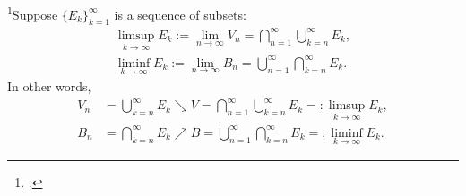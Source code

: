 \documentclass[UTF8,a4paper,10pt]{article}
\begin{document}
  \begin{mybox}{}

    
    \footcite[][49]{Wheeden_Zygmund_2015}Suppose \(\{E_k\}_{k=1}^{\infty}\) is a sequence of subsets:
    \begin{equation*}
      \begin{aligned}
        \limsup_{k\to\infty}E_k := \lim_{n\to\infty} V_n = \bigcap_{n=1}^{\infty}  \bigcup_{k=n}^{\infty} E_k,\\
        \liminf_{k\to\infty}E_k := \lim_{n\to\infty} B_n = \bigcup_{n=1}^{\infty}  \bigcap_{k=n}^{\infty} E_k.
      \end{aligned}
    \end{equation*}
    In other words,
    \begin{equation*}
      \begin{aligned}
         V_n &= \bigcup_{k=n}^{\infty} E_k\searrow V= \bigcap_{n=1}^{\infty}  \bigcup_{k=n}^{\infty} E_k =: \limsup_{k\to\infty}E_k, \\
         B_n &= \bigcap_{k=n}^{\infty} E_k \nearrow B =  \bigcup_{n=1}^{\infty}  \bigcap_{k=n}^{\infty} E_k=:  \liminf_{k\to\infty}E_k.
      \end{aligned}
    \end{equation*}
    
    
  
  \end{mybox}
\end{document}
